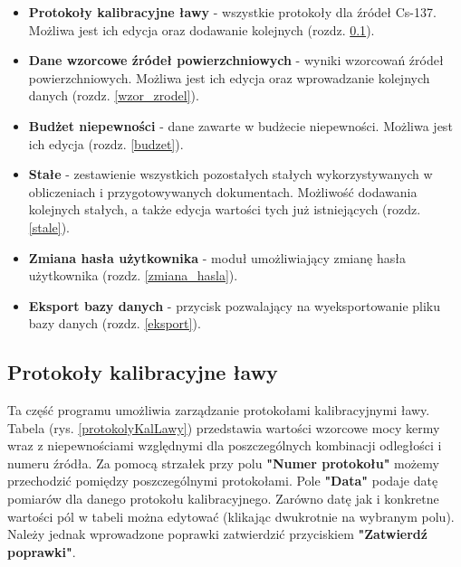 \begin{itemize}
	\item \textbf{Protokoły kalibracyjne ławy} - wszystkie protokoły dla źródeł Cs-137. Możliwa jest ich edycja oraz dodawanie kolejnych (rozdz. \ref{protokoly_kal_lawy}).
	\item  \textbf{Dane wzorcowe źródeł powierzchniowych} - wyniki wzorcowań źródeł powierzchniowych. Możliwa jest ich edycja oraz wprowadzanie kolejnych danych (rozdz. \ref{wzor_zrodel}).
	\item \textbf{Budżet niepewności} - dane zawarte w budżecie niepewności. Możliwa jest ich edycja (rozdz. \ref{budzet}).
	\item \textbf{Stałe} - zestawienie wszystkich pozostałych stałych wykorzystywanych w obliczeniach i przygotowywanych dokumentach. Możliwość dodawania kolejnych stałych, a także edycja wartości tych już istniejących (rozdz. \ref{stale}).
	\item \textbf{Zmiana hasła użytkownika} - moduł umożliwiający zmianę hasła użytkownika (rozdz. \ref{zmiana_hasla}).
	\item \textbf{Eksport bazy danych} - przycisk pozwalający na wyeksportowanie pliku bazy danych (rozdz. \ref{eksport}).
\end{itemize}



\subsection{Protokoły kalibracyjne ławy}
\label{protokoly_kal_lawy}

Ta część programu umożliwia zarządzanie protokołami kalibracyjnymi ławy. Tabela (rys. \ref{protokolyKalLawy}) przedstawia wartości wzorcowe mocy kermy wraz z niepewnościami względnymi dla poszczególnych kombinacji odległości i numeru źródła. Za pomocą strzałek przy polu \textbf{"Numer protokołu"} możemy przechodzić pomiędzy poszczególnymi protokołami. Pole \textbf{"Data"} podaje datę pomiarów dla danego protokołu kalibracyjnego. Zarówno datę jak i konkretne wartości pól w tabeli można edytować (klikając dwukrotnie na wybranym polu). Należy jednak wprowadzone poprawki zatwierdzić przyciskiem \textbf{"Zatwierdź poprawki"}.

